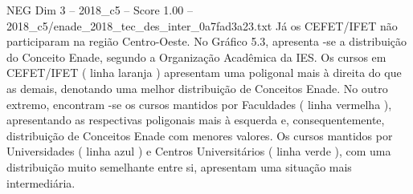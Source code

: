 \begin{textsample}{NEG Dim 3 – 2018\_c5 – Score 1.00 – 2018\_c5/enade\_2018\_tec\_des\_inter\_0a7fad3a23.txt}
Já os CEFET/IFET não participaram na região Centro-Oeste.
No Gráfico 5.3, apresenta -se a distribuição do Conceito Enade, segundo a Organização Acadêmica da IES.
Os cursos em CEFET/IFET ( linha laranja ) apresentam uma poligonal mais à direita do que as demais, denotando uma melhor distribuição de Conceitos Enade.
No outro extremo, encontram -se os cursos mantidos por Faculdades ( linha vermelha ), apresentando as respectivas poligonais mais à esquerda e, consequentemente, distribuição de Conceitos Enade com menores valores.
Os cursos mantidos por Universidades ( linha azul ) e Centros Universitários ( linha verde ), com uma distribuição muito semelhante entre si, apresentam uma situação mais intermediária.

\end{textsample}
